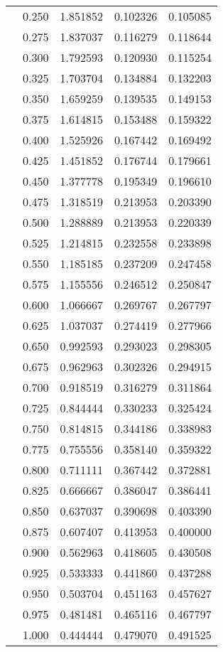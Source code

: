 \begin{tabular}{llrrr}
         & 0.250 &   1.851852 &   0.102326 &   0.105085 \\
         & 0.275 &   1.837037 &   0.116279 &   0.118644 \\
         & 0.300 &   1.792593 &   0.120930 &   0.115254 \\
         & 0.325 &   1.703704 &   0.134884 &   0.132203 \\
         & 0.350 &   1.659259 &   0.139535 &   0.149153 \\
         & 0.375 &   1.614815 &   0.153488 &   0.159322 \\
         & 0.400 &   1.525926 &   0.167442 &   0.169492 \\
         & 0.425 &   1.451852 &   0.176744 &   0.179661 \\
         & 0.450 &   1.377778 &   0.195349 &   0.196610 \\
         & 0.475 &   1.318519 &   0.213953 &   0.203390 \\
         & 0.500 &   1.288889 &   0.213953 &   0.220339 \\
         & 0.525 &   1.214815 &   0.232558 &   0.233898 \\
         & 0.550 &   1.185185 &   0.237209 &   0.247458 \\
         & 0.575 &   1.155556 &   0.246512 &   0.250847 \\
         & 0.600 &   1.066667 &   0.269767 &   0.267797 \\
         & 0.625 &   1.037037 &   0.274419 &   0.277966 \\
         & 0.650 &   0.992593 &   0.293023 &   0.298305 \\
         & 0.675 &   0.962963 &   0.302326 &   0.294915 \\
         & 0.700 &   0.918519 &   0.316279 &   0.311864 \\
         & 0.725 &   0.844444 &   0.330233 &   0.325424 \\
         & 0.750 &   0.814815 &   0.344186 &   0.338983 \\
         & 0.775 &   0.755556 &   0.358140 &   0.359322 \\
         & 0.800 &   0.711111 &   0.367442 &   0.372881 \\
         & 0.825 &   0.666667 &   0.386047 &   0.386441 \\
         & 0.850 &   0.637037 &   0.390698 &   0.403390 \\
         & 0.875 &   0.607407 &   0.413953 &   0.400000 \\
         & 0.900 &   0.562963 &   0.418605 &   0.430508 \\
         & 0.925 &   0.533333 &   0.441860 &   0.437288 \\
         & 0.950 &   0.503704 &   0.451163 &   0.457627 \\
         & 0.975 &   0.481481 &   0.465116 &   0.467797 \\
         & 1.000 &   0.444444 &   0.479070 &   0.491525 \\
\bottomrule
\end{tabular}
